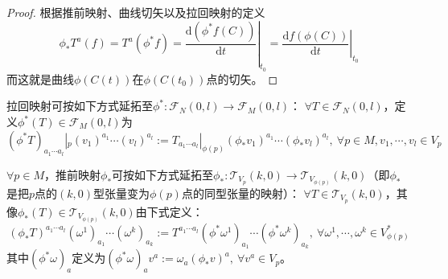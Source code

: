 \begin{proof}
根据推前映射、曲线切矢以及拉回映射的定义
$$\phi_*T^a(f)
= T^a(\phi^*f)
= \left.\frac{\mathrm{d}(\phi^*f(C))}{\mathrm{d}t}\right|_{t_0}
= \left.\frac{\mathrm{d}f(\phi(C))}{\mathrm{d}t}\right|_{t_0}$$
而这就是曲线$\phi(C(t))$在$\phi(C(t_0))$点的切矢。
\end{proof}

\begin{definition}
拉回映射可按如下方式延拓至$\phi^* \colon \mathscr{F}_N(0, l) \to \mathscr{F}_M(0, l)$：
$\forall T \in \mathscr{F}_N(0, l)$，定义$\phi^*(T) \in \mathscr{F}_M(0, l)$为
$$(\phi^*T)_{a_1 \cdots a_l}|_p(v_1)^{a_1}\cdots(v_l)^{a_l} := T_{a_1 \cdots a_l}|_{\phi(p)}(\phi_*v_1)^{a_1}\cdots(\phi_*v_l)^{a_l}, ~ \forall p \in M, v_1, \cdots, v_l \in V_p$$
\end{definition}

\begin{definition}
$\forall p \in M$，推前映射$\phi_*$可按如下方式延拓至$\phi_* \colon \mathscr{T}_{V_p}(k, 0) \to \mathscr{T}_{V_{\phi(p)}}(k, 0)$（即$\phi_*$是把$p$点的$(k, 0)$型张量变为$\phi(p)$点的同型张量的映射）：
$\forall T \in \mathscr{T}_{V_p}(k, 0)$，其像$\phi_*(T) \in \mathscr{T}_{V_{\phi(p)}}(k, 0)$由下式定义：
$$(\phi_*T)^{a_1 \cdots a_l}(\omega^1)_{a_1}\cdots(\omega^k)_{a_k} := T^{a_1 \cdots a_l}(\phi^*\omega^1)_{a_1}\cdots(\phi^*\omega^k)_{a_k}, ~ \forall \omega^1, \cdots, \omega^k \in V^*_{\phi(p)}$$
其中$(\phi^*\omega)_a$定义为$(\phi^*\omega)_av^a := \omega_a(\phi_*v)^a, ~ \forall v^a \in V_p$。
\end{definition}

